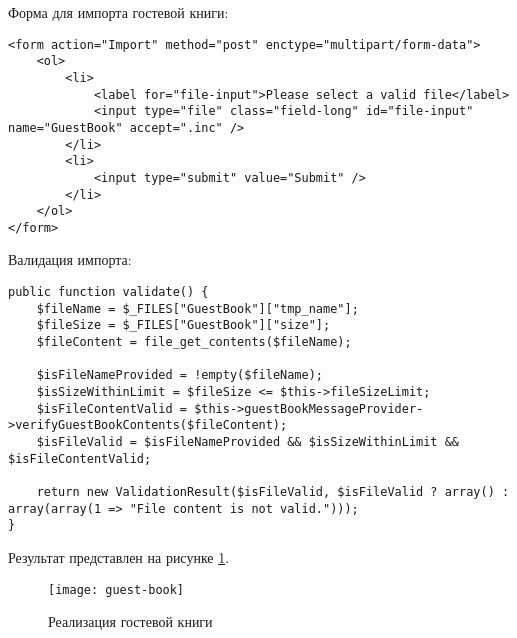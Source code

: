 \documentclass[a4paper,14pt]{extarticle}
\begin{document}
Форма для импорта гостевой книги:
\begin{lstlisting}
<form action="Import" method="post" enctype="multipart/form-data">
    <ol>
        <li>
            <label for="file-input">Please select a valid file</label>
            <input type="file" class="field-long" id="file-input" name="GuestBook" accept=".inc" />
        </li>
        <li>
            <input type="submit" value="Submit" />
        </li>
    </ol>
</form>
\end{lstlisting}
Валидация импорта:
\begin{lstlisting}
public function validate() {
    $fileName = $_FILES["GuestBook"]["tmp_name"];
    $fileSize = $_FILES["GuestBook"]["size"];
    $fileContent = file_get_contents($fileName);

    $isFileNameProvided = !empty($fileName);
    $isSizeWithinLimit = $fileSize <= $this->fileSizeLimit;
    $isFileContentValid = $this->guestBookMessageProvider->verifyGuestBookContents($fileContent);
    $isFileValid = $isFileNameProvided && $isSizeWithinLimit && $isFileContentValid;

    return new ValidationResult($isFileValid, $isFileValid ? array() : array(array(1 => "File content is not valid.")));
}
\end{lstlisting}

Результат представлен на рисунке \ref{fig:guest-book}.
\begin{figure}[H]
    \centering
    \texttt{[image: guest-book]}
    \caption{Реализация гостевой книги}
    \label{fig:guest-book}
\end{figure}
\end{document}
